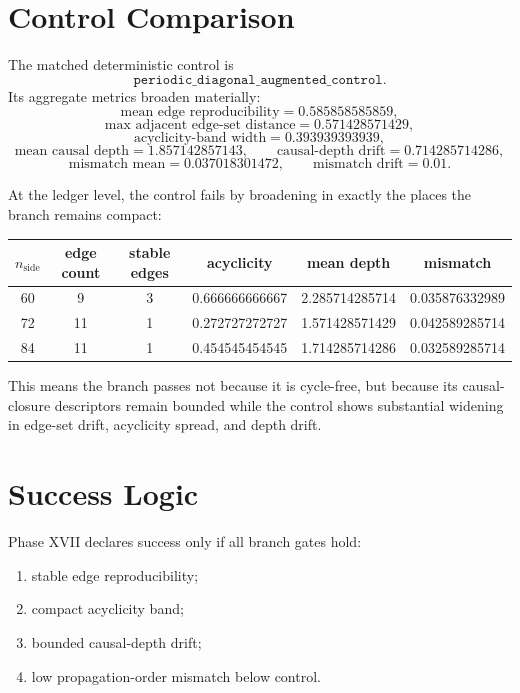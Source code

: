 \documentclass[11pt]{article}
\begin{document}
\section{Control Comparison}

The matched deterministic control is
\[
\texttt{periodic\_diagonal\_augmented\_control}.
\]
Its aggregate metrics broaden materially:
\[
\text{mean edge reproducibility}=0.585858585859,
\]
\[
\text{max adjacent edge-set distance}=0.571428571429,
\]
\[
\text{acyclicity-band width}=0.393939393939,
\]
\[
\text{mean causal depth}=1.857142857143,
\qquad
\text{causal-depth drift}=0.714285714286,
\]
\[
\text{mismatch mean}=0.037018301472,
\qquad
\text{mismatch drift}=0.01.
\]

At the ledger level, the control fails by broadening in exactly the places the branch remains compact:
\begin{center}
\begin{tabular}{cccccc}
\toprule
$n_{\mathrm{side}}$ & edge count & stable edges & acyclicity & mean depth & mismatch \\
\midrule
60 & 9  & 3 & 0.666666666667 & 2.285714285714 & 0.035876332989 \\
72 & 11 & 1 & 0.272727272727 & 1.571428571429 & 0.042589285714 \\
84 & 11 & 1 & 0.454545454545 & 1.714285714286 & 0.032589285714 \\
\bottomrule
\end{tabular}
\end{center}

This means the branch passes not because it is cycle-free, but because its causal-closure descriptors remain bounded while the control shows substantial widening in edge-set drift, acyclicity spread, and depth drift.

\section{Success Logic}

Phase XVII declares success only if all branch gates hold:
\begin{enumerate}
\item stable edge reproducibility;
\item compact acyclicity band;
\item bounded causal-depth drift;
\item low propagation-order mismatch below control.
\end{enumerate}
\end{document}
